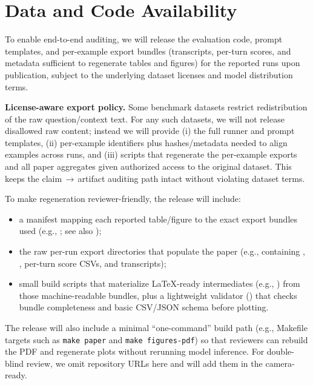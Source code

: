 \documentclass[11pt]{article}
\begin{document}
\section{Data and Code Availability}
\label{sec:availability}
To enable end-to-end auditing, we will release the evaluation code, prompt templates, and per-example export bundles (transcripts, per-turn scores, and metadata sufficient to regenerate tables and figures) for the reported runs upon publication, subject to the underlying dataset licenses and model distribution terms.

\textbf{License-aware export policy.} Some benchmark datasets restrict redistribution of the raw question/context text. For any such datasets, we will not release disallowed raw content; instead we will provide (i) the full runner and prompt templates, (ii) per-example identifiers plus hashes/metadata needed to align examples across runs, and (iii) scripts that regenerate the per-example exports and all paper aggregates given authorized access to the original dataset. This keeps the claim\,$\rightarrow$\,artifact auditing path intact without violating dataset terms.

To make regeneration reviewer-friendly, the release will include:
\begin{itemize}[leftmargin=*]
  \item a manifest mapping each reported table/figure to the exact export bundles used (e.g., ; see also );
  \item the raw per-run export directories that populate the paper (e.g.,  containing , , per-turn score CSVs, and transcripts);
  \item small build scripts that materialize LaTeX-ready intermediates (e.g., ) from those machine-readable bundles, plus a lightweight validator () that checks bundle completeness and basic CSV/JSON schema before plotting.
\end{itemize}

The release will also include a minimal ``one-command'' build path (e.g., Makefile targets such as \texttt{make paper} and \texttt{make figures-pdf}) so that reviewers can rebuild the PDF and regenerate plots without rerunning model inference.
For double-blind review, we omit repository URLs here and will add them in the camera-ready.
\end{document}
